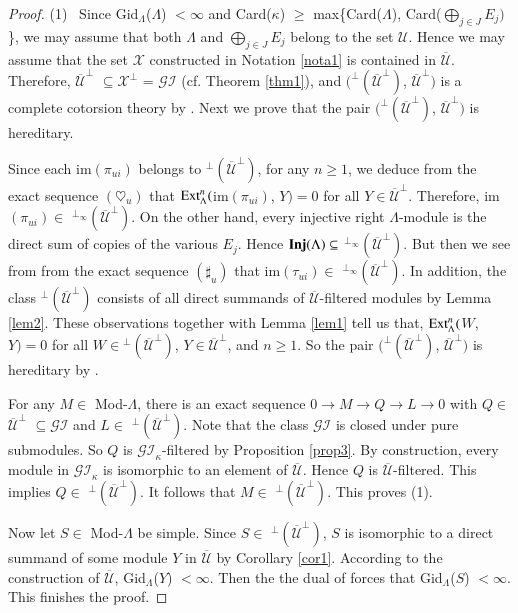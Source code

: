 \documentclass[11pt,a4paper]{article}
\begin{document}
\begin{proof} (1) \ Since  {\rm Gid}$_{\Lambda}$($\Lambda$)  $< \infty$ and   {\rm Card($\kappa$)} $\geq$ max\{Card($\Lambda$),  Card($\bigoplus_{j\in J}E_{j})$\},
 we may assume that both $\Lambda$ and  $\bigoplus_{j\in J}E_{j}$ belong to the set $\mathscr{U}$.
Hence  we may assume that  the set $\mathscr{X}$ constructed in Notation  \ref{nota1}  is contained in $\overline{\mathscr{U}}$.  Therefore, $ \overline{\mathscr{U}}^\perp $  $\subseteq \mathscr{X}^\perp$ =
  $\mathscr{GI}$ (cf. Theorem \ref{thm1}),
 and $(^\perp(\overline{\mathscr{U}}^\perp)$, $\overline{\mathscr{U}}^\perp)$ is a   complete
  cotorsion theory by  \cite[Theorem 7.4.1]{eno5}. Next we prove that the pair $(^\perp(\overline{\mathscr{U}}^\perp)$, $\overline{\mathscr{U}}^\perp)$ is hereditary.

  Since  each im$(\pi_{ui})$ belongs to $^\perp(\overline{\mathscr{U}}^\perp)$, for any $n \geq 1$, we deduce from the exact sequence $(\heartsuit_{u})$
that ${\rm Ext}_{\Lambda}^{n}($im$(\pi_{ui})$, $Y)=0$ for all $Y \in \overline{\mathscr{U}}^\perp$. Therefore, im$(\pi_{ui}) \in$  $^{\perp_{\infty}}(\overline{\mathscr{U}}^\perp)$.
On the other hand, every injective right  $\Lambda$-module is the direct sum
of copies of the various $E_{j}$. Hence   ${\bf Inj}(\Lambda) \subseteq $  $^{\perp_{\infty}}(\overline{\mathscr{U}}^\perp)$.
But then we see from from the exact sequence $(\sharp_{u})$
that  im$(\tau_{ui}) \in$  $^{\perp_{\infty}}(\overline{\mathscr{U}}^\perp)$.
   In addition, the class  $^\perp(\overline{\mathscr{U}}^\perp)$ consists of all direct summands of $\overline{\mathscr{U}}$-filtered modules by Lemma \ref{lem2}.
These observations  together with Lemma \ref{lem1} tell us that, ${\rm Ext}_{\Lambda}^{n}($$W$, $Y)=0$ for all $W \in {^\perp(\overline{\mathscr{U}}^\perp)}$, $Y \in \overline{\mathscr{U}}^\perp$,  and $n \geq 1$.
So the pair $(^\perp(\overline{\mathscr{U}}^\perp)$, $\overline{\mathscr{U}}^\perp)$   is hereditary by \cite[Lemma 5.24]{gbe}.

  For any $M \in $ Mod-$\Lambda$, there is an exact sequence
$0\rightarrow  M    \rightarrow Q \rightarrow  L\rightarrow 0   $ with  $Q\in $ $\overline{\mathscr{U}}^\perp$ $\subseteq \mathscr{GI}$ and  $L \in $ $^\perp(\overline{\mathscr{U}}^\perp)$.
Note that the class   $\mathscr{GI}$   is closed under pure submodules. So $Q $ is $\mathscr{GI}_{\kappa}$-filtered by Proposition \ref{prop3}.
By  construction,  every module in $\mathscr{GI}_{\kappa}$  is isomorphic to an element of $\overline{\mathscr{U}}$.  Hence $Q $ is $\overline{\mathscr{U}}$-filtered.
This implies $Q \in $ $^\perp(\overline{\mathscr{U}}^\perp)$. It follows that $M\in $ $^\perp(\overline{\mathscr{U}}^\perp)$. This proves (1).


 Now let   $S\in $ Mod-$\Lambda$ be simple. Since $S\in $ $^\perp(\overline{\mathscr{U}}^\perp)$, $S$ is  isomorphic to a  direct summand of some module $Y$  in
 $\overline{\mathscr{U}}$ by Corollary  \ref{cor1}. According to the construction of $\overline{\mathscr{U}}$, {\rm Gid}$_{\Lambda}$($Y$)  $< \infty$.
Then the  the dual   of \cite[Proposition 2.19]{hol} forces that {\rm Gid}$_{\Lambda}$($S$)  $< \infty$.  This   finishes  the proof.
  \end{proof}
\end{document}
